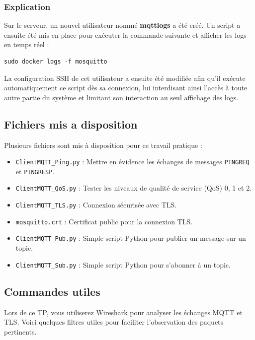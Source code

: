 \documentclass{article}
\begin{document}
\subsubsection{Explication}  
\noindent  
Sur le serveur, un nouvel utilisateur nommé \textbf{mqttlogs} a été créé. Un script a ensuite été mis en place pour exécuter la commande suivante et afficher les logs en temps réel :  

\begin{verbatim}  
sudo docker logs -f mosquitto  
\end{verbatim}  

\noindent  
La configuration SSH de cet utilisateur a ensuite été modifiée afin qu'il exécute automatiquement ce script dès sa connexion, lui interdisant ainsi l'accès à toute autre partie du système et limitant son interaction au seul affichage des logs.

\subsection{Fichiers mis a disposition}

Plusieurs fichiers sont mis à disposition pour ce travail pratique :

\begin{itemize}
    \item \texttt{ClientMQTT\_Ping.py} : Mettre en évidence les échanges de messages \texttt{PINGREQ} et \texttt{PINGRESP}.
    \item \texttt{ClientMQTT\_QoS.py} : Tester les niveaux de qualité de service (QoS) 0, 1 et 2.
    \item \texttt{ClientMQTT\_TLS.py} : Connexion sécurisée avec TLS.
    \item \texttt{mosquitto.crt} : Certificat public pour la connexion TLS.
    \item \texttt{ClientMQTT\_Pub.py} : Simple script Python pour publier un message sur un topic.
    \item \texttt{ClientMQTT\_Sub.py} : Simple script Python pour s'abonner à un topic.
\end{itemize}

\subsection{Commandes utiles}

Lors de ce TP, vous utiliserez Wireshark pour analyser les échanges MQTT et TLS. Voici quelques filtres utiles pour faciliter l'observation des paquets pertinents.
\end{document}
